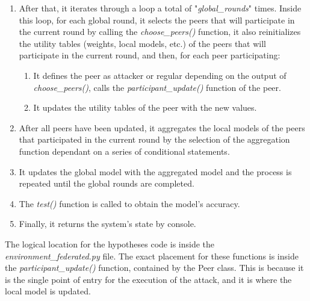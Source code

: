 \begin{itemize}
\begin{itemize}
\begin{itemize}
\begin{enumerate}
                                \item After that, it iterates through a loop a total of "\textit{global\_rounds}" times. Inside this loop, for each global round, it selects the peers that will participate in the current round by calling the \textit{choose\_peers()} function, it also reinitializes the utility tables (weights, local models, etc.) of the peers that will participate in the current round, and then, for each peer participating:
                                \begin{enumerate}
                                        \item It defines the peer as attacker or regular depending on the output of \textit{choose\_peers()}, calls the \textit{participant\_update()} function of the peer.
                                        \item It updates the utility tables of the peer with the new values.
                                \end{enumerate}
                                \item After all peers have been updated, it aggregates the local models of the peers that participated in the current round by the selection of the aggregation function dependant on a series of conditional statements.
                                \item It updates the global model with the aggregated model and the process is repeated until the global rounds are completed.
                                \item The \textit{test()} function is called to obtain the model's accuracy.
                                \item Finally, it returns the system's state by console.
                        \end{enumerate}
                \end{itemize}
        \end{itemize}
\end{itemize}
The logical location for the hypotheses code is inside the \textit{environment\_federated.py} file. The exact placement for these functions is inside the \textit{participant\_update()} function, contained by the Peer class.
This is because it is the single point of entry for the execution of the attack, and it is where the local model is updated.



